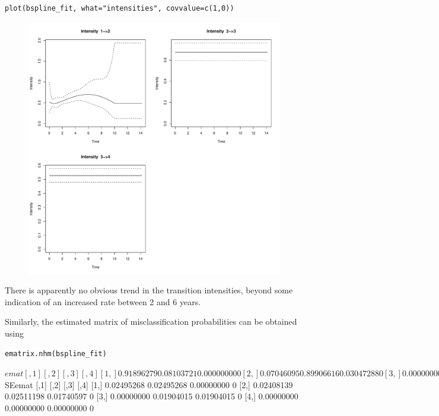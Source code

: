 \documentclass{article}
\numberwithin{equation}{section}
\begin{document}
\begin{verbatim}
plot(bspline_fit, what="intensities", covvalue=c(1,0))
\end{verbatim}
\begin{figure}[ht]
\begin{center}
\includegraphics[scale=0.3]{Figures/bspline_fit2.pdf}
\end{center}
\end{figure}


There is apparently no obvious trend in the transition intensities, beyond some indication of an increased rate between 2 and 6 years.

Similarly, the estimated matrix of misclassification probabilities can be obtained using
\begin{verbatim}
ematrix.nhm(bspline_fit)
\end{verbatim}
\begin{verbout}
$emat
           [,1]       [,2]       [,3] [,4]
[1,] 0.91896279 0.08103721 0.00000000    0
[2,] 0.07046095 0.89906616 0.03047288    0
[3,] 0.00000000 0.09200885 0.90799115    0
[4,] 0.00000000 0.00000000 0.00000000    1

$SEemat
           [,1]       [,2]       [,3] [,4]
[1,] 0.02495268 0.02495268 0.00000000    0
[2,] 0.02408139 0.02511198 0.01740597    0
[3,] 0.00000000 0.01904015 0.01904015    0
[4,] 0.00000000 0.00000000 0.00000000    0
\end{verbout}
\end{document}
